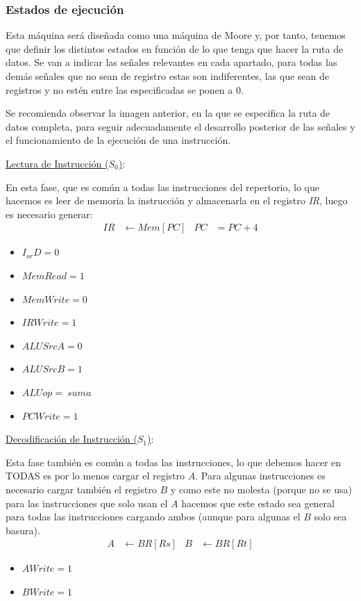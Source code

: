 \documentclass[a4paper,10pt]{book}
\begin{document}
\subsubsection*{Estados de ejecución}
Esta máquina será diseñada como una máquina de Moore y, por tanto, tenemos que definir los distintos estados en función de lo que tenga que hacer la ruta de datos. Se van a indicar las señales relevantes en cada apartado, para todas las demás señales que no sean de registro estas son indiferentes, las que sean de registros y no estén entre las especificadas se ponen a 0.

Se recomienda observar la imagen anterior, en la que se especifica la ruta de datos completa, para seguir adecuadamente el desarrollo posterior de las señales y el funcionamiento de la ejecución de una instrucción.

\underline{Lectura de Instrucción ($S_0$)}:

En esta fase, que es común a todas las instrucciones del repertorio, lo que hacemos es leer de memoria la instrucción y almacenarla en el registro \textit{IR}, luego es necesario generar:
\begin{align*}
IR & \leftarrow Mem[PC] & PC & = PC+4
\end{align*}
\begin{multicols}{2}
\begin{itemize}
\item $I_{or}D = 0$
\item $MemRead = 1$
\item $MemWrite = 0$
\item $IRWrite = 1$
\item $ALUSrcA = 0$
\item $ALUSrcB = 1$
\item $ALUop = \ suma$
\item $PCWrite = 1$
\end{itemize}
\end{multicols}

\underline{Decodificación de Instrucción ($S_1$)}:

Esta fase también es común a todas las instrucciones, lo que debemos hacer en TODAS es por lo menos cargar el registro $A$. Para algunas instrucciones es necesario cargar también el registro $B$ y como este no molesta (porque no se usa) para las instrucciones que solo usan el $A$ hacemos que este estado sea general para todas las instrucciones cargando ambos (aunque para algunas el $B$ solo sea basura).
\begin{align*}
A & \leftarrow BR[Rs] & B & \leftarrow BR[Rt]
\end{align*}
\begin{itemize}
\item $AWrite = 1$
\item $BWrite = 1$
\end{itemize}
\end{document}
